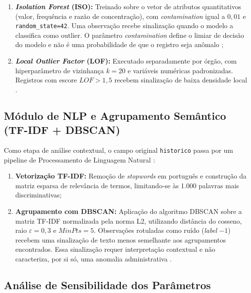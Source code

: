 \documentclass[
    12pt,               %
    openright,          %
    oneside,            %
    a4paper,            %
    chapter=TITLE,      %
    sumario=tradicional,%
    english,            %
    brazilian,          %
 ]{abntex2}
\begin{document}
\begin{enumerate}
    \item \textbf{\textit{Isolation Forest} (ISO):} Treinado sobre o vetor de atributos quantitativos (valor, frequência e razão de concentração), com \textit{contamination} igual a $0,01$ e \texttt{random\_state=42}. Uma observação recebe sinalização quando o modelo a classifica como outlier. O parâmetro \textit{contamination} define o limiar de decisão do modelo e não é uma probabilidade de que o registro seja anômalo \cite{liu2008isolation};
    \item \textbf{\textit{Local Outlier Factor} (LOF):} Executado separadamente por órgão, com hiperparâmetro de vizinhança $k = 20$ e variáveis numéricas padronizadas. Registros com escore $LOF > 1,5$ recebem sinalização de baixa densidade local \cite{breunig2000lof}.
\end{enumerate}

\subsection{Módulo de NLP e Agrupamento Semântico (TF-IDF + DBSCAN)}\label{subsec:modulo_nlp}

Como etapa de análise contextual, o campo original \texttt{historico} passa por um pipeline de Processamento de Linguagem Natural \cite{goldschmidt2005, ester1996dbscan}:

\begin{enumerate}
    \item \textbf{Vetorização TF-IDF:} Remoção de \textit{stopwords} em português e construção da matriz esparsa de relevância de termos, limitando-se às 1.000 palavras mais discriminativas;
    \item \textbf{Agrupamento com DBSCAN:} Aplicação do algoritmo DBSCAN sobre a matriz TF-IDF normalizada pela norma L2, utilizando distância do cosseno, raio $\varepsilon = 0,3$ e $MinPts = 5$. Observações rotuladas como ruído (\textit{label} $-1$) recebem uma sinalização de texto menos semelhante aos agrupamentos encontrados. Essa sinalização requer interpretação contextual e não caracteriza, por si só, uma anomalia administrativa \cite{ester1996dbscan, vieira2019}.
\end{enumerate}

\subsection{Análise de Sensibilidade dos Parâmetros}\label{subsec:analise_sensibilidade}
\end{document}
